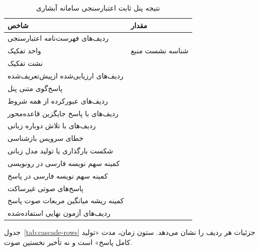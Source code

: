 \begin{table}[ht]
\centering
\caption{نتیجه پنل ثابت اعتبارسنجی سامانه آبشاری}
\label{tab:cascade-panel}
\small
\begin{tabular}{L{7.6cm}R{3.2cm}}
\toprule
\textbf{شاخص} & \textbf{مقدار} \\
\midrule
ردیف‌های فهرست‌نامه اعتبارسنجی &  \\
واحد تفکیک & شناسه نشست منبع \\
نشت تفکیک &  \\
ردیف‌های ارزیابی‌شده ازپیش‌تعریف‌شده &  \\
پاسخ‌گوی متنی پنل &  \\
\midrule
ردیف‌های عبور‌کرده از همه شروط &  \\
ردیف‌های با پاسخ جایگزین قاعده‌محور &  \\
ردیف‌های با تلاش دوباره زبانی &  \\
خطای سرویس بازشناسی &  \\
شکست بارگذاری یا تولید مدل زبانی &  \\
کمینه سهم نویسه فارسی در رونویسی &  \\
کمینه سهم نویسه فارسی در پاسخ &  \\
پاسخ‌های صوتی غیرساکت &  \\
کمینه ریشه میانگین مربعات صوت پاسخ &  \\
ردیف‌های آزمون نهایی استفاده‌شده &  \\
\bottomrule
\end{tabular}
\end{table}

جدول~\ref{tab:cascade-rows} جزئیات هر ردیف را نشان می‌دهد. ستون زمان،
مدت «تولید کامل پاسخ» است و نه تأخیر نخستین صوت.

